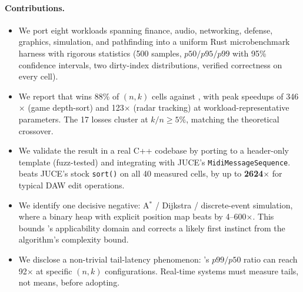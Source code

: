 \paragraph{Contributions.}
\begin{itemize}
  \item We port eight workloads spanning finance, audio, networking, defense,
        graphics, simulation, and pathfinding into a uniform Rust microbenchmark
        harness with rigorous statistics (500 samples, $p50/p95/p99$ with 95\%
        confidence intervals, two dirty-index distributions, verified
        correctness on every cell).
  \item We report that \DeltaSort wins 88\% of $(n,k)$ cells against \ESM,
        with peak speedups of 346$\times$ (game depth-sort) and 123$\times$
        (radar tracking) at workload-representative parameters. The 17 losses
        cluster at $k/n \geq 5\%$, matching the theoretical crossover.
  \item We validate the result in a real C++ codebase by porting \DeltaSort
        to a header-only template (fuzz-tested) and integrating with JUCE's
        \texttt{MidiMessageSequence}. \DeltaSort beats JUCE's stock
        \texttt{sort()} on all 40 measured cells, by up to
        \textbf{2624$\times$} for typical DAW edit operations.
  \item We identify one decisive negative: A$^*$ / Dijkstra / discrete-event
        simulation, where a binary heap with explicit position map beats
        \DeltaSort by 4--600$\times$. This bounds \DeltaSort's applicability
        domain and corrects a likely first instinct from the algorithm's
        complexity bound.
  \item We disclose a non-trivial tail-latency phenomenon: \DeltaSort's $p99/p50$
        ratio can reach 92$\times$ at specific $(n,k)$ configurations. Real-time
        systems must measure tails, not means, before adopting.
\end{itemize}
